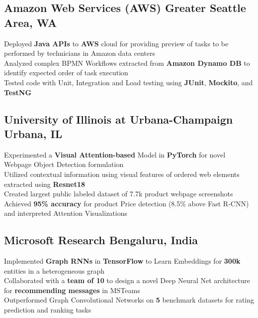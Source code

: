 \documentclass[]{Resume}
\begin{document}
\subsection{Amazon Web Services (AWS) \hfill \normalfont Greater Seattle Area, WA}
\pt Deployed \textbf{Java APIs} to \textbf{AWS} cloud for providing preview of tasks to be performed by technicians in Amazon data centers \\
\pt Analyzed complex BPMN Workflows extracted from \textbf{Amazon Dynamo DB} to identify expected order of task execution \\
\pt Tested code with Unit, Integration and Load testing using \textbf{JUnit}, \textbf{Mockito}, and \textbf{TestNG}
\sectionsep

\subsection{University of Illinois at Urbana-Champaign \hfill \normalfont Urbana, IL}
\pt Experimented a \textbf{Visual Attention-based} Model in \textbf{PyTorch} for novel Webpage Object Detection formulation \\
\pt Utilized contextual information using visual features of ordered web elements extracted using \textbf{Resnet18} \\  
\pt Created largest public labeled dataset of 7.7k product webpage screenshots \\
\pt Achieved \textbf{95\% accuracy} for product Price detection (8.5\% above Fast R-CNN) and interpreted Attention Visualizations
\sectionsep

\subsection{Microsoft Research \hfill \normalfont Bengaluru, India}
\pt Implemented \textbf{Graph RNNs} in \textbf{TensorFlow} to Learn Embeddings for \textbf{300k} entities in a heterogeneous graph \\
\pt Collaborated with a \textbf{team of 10} to design a novel Deep Neural Net architecture for \textbf{recommending messages} in MSTeams \\
\pt Outperformed Graph Convolutional Networks on \textbf{5} benchmark datasets for rating prediction and ranking tasks
\sectionsep
\end{document}
